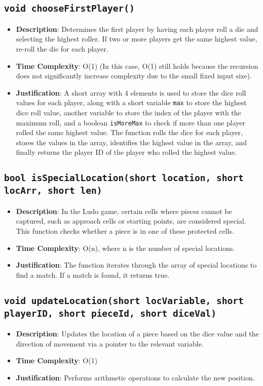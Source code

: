 \documentclass{article}
\begin{document}
\subsection{\texttt{void chooseFirstPlayer()}}
\begin{itemize}
    \item \textbf{Description}: Determines the first player by having each player roll a die and selecting the highest roller. If two or more players get the same highest value, re-roll the die for each player.
    \item \textbf{Time Complexity}: O(1) (In this case, O(1) still holds because the recursion does not significantly increase complexity due to the small fixed input size).
    \item \textbf{Justification}: A short array with 4 elements is used to store the dice roll values for each player, along with a short variable \texttt{max} to store the highest dice roll value, another variable to store the index of the player with the maximum roll, and a boolean \texttt{isMoreMax} to check if more than one player rolled the same highest value. The function rolls the dice for each player, stores the values in the array, identifies the highest value in the array, and finally returns the player ID of the player who rolled the highest value.
\end{itemize}

\subsection{\texttt{bool isSpecialLocation(short location, short locArr, short len)}}
\begin{itemize}
    \item \textbf{Description}: In the Ludo game, certain cells where pieces cannot be captured, such as approach cells or starting points, are considered special. This function checks whether a piece is in one of these protected cells.
    \item \textbf{Time Complexity}: O(n), where n is the number of special locations.
    \item \textbf{Justification}: The function iterates through the array of special locations to find a match. If a match is found, it returns true.
\end{itemize}

\subsection{\texttt{void updateLocation(short locVariable, short playerID, short pieceId, short diceVal)}}
\begin{itemize}
    \item \textbf{Description}: Updates the location of a piece based on the dice value and the direction of movement via a pointer to the relevant variable.
    \item \textbf{Time Complexity}: O(1)
    \item \textbf{Justification}: Performs arithmetic operations to calculate the new position.
\end{itemize}
\end{document}
